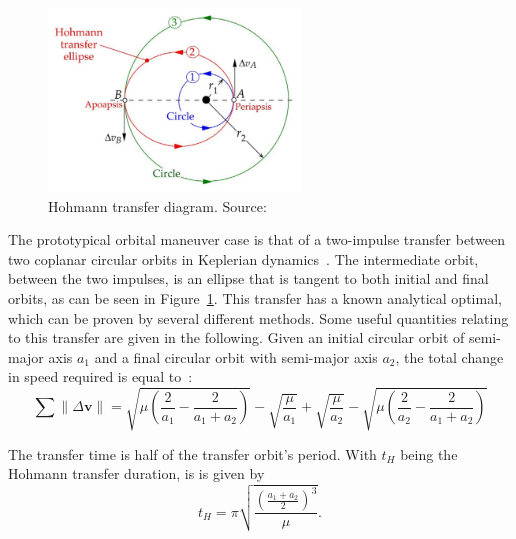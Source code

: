 \begin{figure}[htbp]
    \centering
    \includegraphics[width=0.6\textwidth]{img/hohmann_from_curtis.png}
    \caption{Hohmann transfer diagram. Source: \cite{curtis2015orbital}}
    \label{fig:hohmann_diagram}
\end{figure}

The prototypical orbital maneuver case is that of a two-impulse transfer between two coplanar circular orbits in Keplerian dynamics~\cite{chobotov}. The intermediate orbit, between the two impulses, is an ellipse that is tangent to both initial and final orbits, as can be seen in Figure~\ref{fig:hohmann_diagram}. This transfer has a known analytical optimal, which can be proven by several different methods. Some useful quantities relating to this transfer are given in the following. Given an initial circular orbit of semi-major axis \(a_1\) and a final circular orbit with semi-major axis \(a_2\), the total change in speed required is equal to~\cite{chobotov}:
\begin{equation}\label{eq:hohmann_deltav}
    \sum \lVert \Delta \mathbf{v} \rVert = \sqrt{\mu\left(\frac{2}{a_1}-\frac{2}{a_1+a_2}\right)} - \sqrt{\frac{\mu}{a_1}} + \sqrt{\frac{\mu}{a_2}} - \sqrt{\mu\left(\frac{2}{a_2}-\frac{2}{a_1+a_2}\right)}
\end{equation}

The transfer time is half of the transfer orbit's period. With \(t_H\) being the Hohmann transfer duration, is is given by~\cite{chobotov} 
\begin{equation}\label{eq:hohmann_time}
    t_H = \pi \sqrt{\frac{\left(\frac{a_1+a_2}{2}\right)^3}{\mu}}.
\end{equation}

